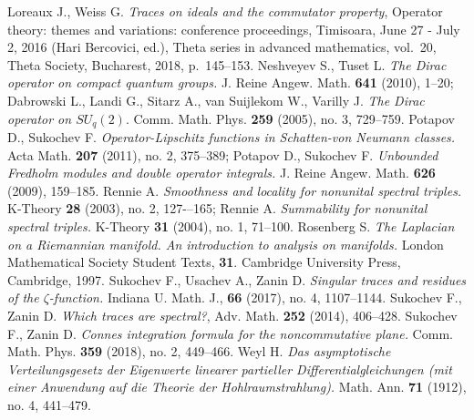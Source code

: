 \documentclass[12pt]{article}
\begin{document}
\begin{thebibliography}{99}
 Loreaux J., Weiss G. {\it Traces on ideals and the commutator property}, Operator theory: themes and variations: conference proceedings, Timisoara, June 27 - July 2, 2016 (Hari Bercovici, ed.), Theta series in advanced mathematics, vol.~20, Theta Society, Bucharest, 2018, p.~145--153.
 Neshveyev S., Tuset L. {\it The Dirac operator on compact quantum groups.} J. Reine Angew. Math. {\bf 641} (2010), 1--20; Dabrowski L., Landi G., Sitarz A., van Suijlekom W., Varilly J. {\it The Dirac operator on $SU_q(2).$} Comm. Math. Phys. {\bf 259} (2005), no. 3, 729--759.
 Potapov D., Sukochev F. {\it Operator-Lipschitz functions in Schatten-von Neumann classes.} Acta Math. {\bf 207} (2011), no. 2, 375--389; Potapov D., Sukochev F. {\it Unbounded Fredholm modules and double operator integrals.} J. Reine Angew. Math. {\bf 626} (2009), 159--185.
 Rennie A. {\it Smoothness and locality for nonunital spectral triples.} K-Theory {\bf 28} (2003), no. 2, 127-–165; Rennie A. {\it Summability for nonunital spectral triples. } K-Theory {\bf 31} (2004), no. 1, 71--100.
 Rosenberg S. {\it The Laplacian on a Riemannian manifold. An introduction to analysis on manifolds.} London Mathematical Society Student Texts, {\bf 31}. Cambridge University Press, Cambridge, 1997.
 Sukochev F., Usachev A., Zanin D. {\it Singular traces and residues of the $\zeta$-function.} Indiana U. Math. J., {\bf 66} (2017), no. 4, 1107--1144.
 Sukochev F., Zanin D. {\it Which traces are spectral?}, Adv. Math. {\bf 252} (2014), 406--428.
 Sukochev F., Zanin D. {\it Connes integration formula for the noncommutative plane.} Comm. Math. Phys. {\bf 359} (2018), no. 2, 449--466.
 Weyl H. {\it Das asymptotische Verteilungsgesetz der Eigenwerte linearer partieller Differentialgleichungen (mit einer Anwendung auf die Theorie der Hohlraumstrahlung).} Math. Ann. {\bf 71} (1912), no. 4, 441--479. 
\end{thebibliography}
\end{document}
